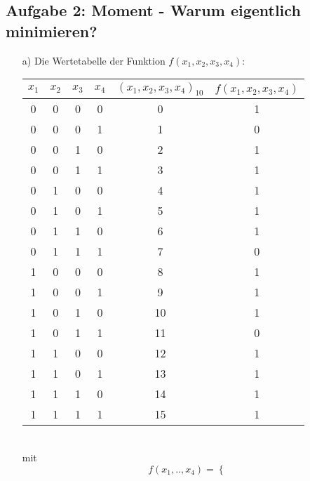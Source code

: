 \documentclass{article}
\begin{document}
	
    \subsection*{Aufgabe 2: Moment - Warum eigentlich minimieren?}
    \begin{itemize}
    	\item[a)]Die Wertetabelle der Funktion $f(x_1,x_2,x_3,x_4)$:
		\begin{table*}[h]
			\centering
    		\begin{tabular}{c|c|c|c|c|c}
    			$x_1$ & $x_2$ & $x_3$ & $x_4$ & $(x_1, x_2, x_3, x_4)_{10}$ & $f(x_1,x_2,x_3,x_4)$ \\ \hline
    			0   &   0   &   0   &   0   &  0 &        1           \\
    			0   &   0   &   0   &   1   &  1 &          0           \\
    			0   &   0   &   1   &   0   &  2 &          1           \\
    			0   &   0   &   1   &   1   &  3 &          1           \\
    			0   &   1   &   0   &   0   &  4 &          1           \\
    			0   &   1   &   0   &   1   &  5 &          1           \\
    			0   &   1   &   1   &   0   &  6 &          1           \\
    			0   &   1   &   1   &   1   &  7 &          0           \\
    			1   &   0   &   0   &   0   &  8 &          1           \\
    			1   &   0   &   0   &   1   &  9 &          1           \\
    			1   &   0   &   1   &   0   & 10 &          1           \\
    			1   &   0   &   1   &   1   & 11 &          0           \\
    			1   &   1   &   0   &   0   & 12 &          1           \\
    			1   &   1   &   0   &   1   & 13 &          1           \\
    			1   &   1   &   1   &   0   & 14 &          1           \\
    			1   &   1   &   1   &   1   & 15 &          1
    		\end{tabular}
		\end{table*}\\
		mit
    	\begin{equation*}
    		f(x_1,..,x_4) =
    		\begin{cases}

\end{cases}
\end{equation*}
\end{itemize}
\end{document}
